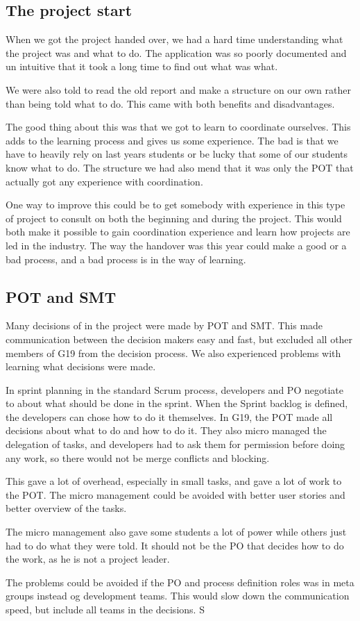 \subsection{The project start}
When we got the project handed over, we had a hard time understanding what the project was and what to do. The application was so poorly documented and un intuitive that it took a long time to find out what was what.

We were also told to read the old report and make a structure on our own rather than being told what to do. This came with both benefits and disadvantages.

The good thing about this was that we got to learn to coordinate ourselves. This adds to the learning process and gives us some experience. The bad is that we have to heavily rely on last years students or be lucky that some of our students know what to do. The structure we had also mend that it was only the \gls{POT} that actually got any experience with coordination.

One way to improve this could be to get somebody with experience in this type of project to consult on both the beginning and during the project. This would both make it possible to gain coordination experience and learn how projects are led in the industry. The way the handover was this year could make a good or a bad process, and a bad process is in the way of learning. 

\subsection{\gls{POT} and \gls{SMT}}
Many decisions of in the project were made by \gls{POT} and \gls{SMT}. This made communication between the decision makers easy and fast, but excluded all other members of \gls{G19} from the decision process. We also experienced problems with learning what decisions were made.

In sprint planning in the standard Scrum process, developers and PO negotiate to about what should be done in the sprint. When the Sprint backlog is defined, the developers can chose how to do it themselves. In \gls{G19}, the \Gls{POT} made all decisions about what to do and how to do it. They also micro managed the delegation of tasks, and developers had to ask them for permission before doing any work, so there would not be merge conflicts and blocking.

This gave a lot of overhead, especially in small tasks, and gave a lot of work to the \gls{POT}. The micro management could be avoided with better user stories and better overview of the tasks.

The micro management also gave some students a lot of power while others just had to do what they were told. It should not be the PO that decides how to do the work, as he is not a project leader.

The problems could be avoided if the PO and process definition roles was in meta groups instead og development teams. This would slow down the communication speed, but include all teams in the decisions.  S